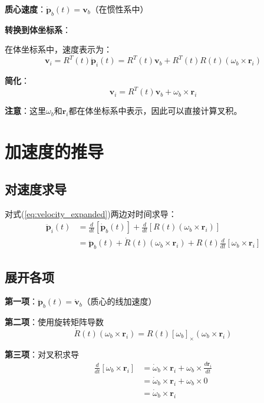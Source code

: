 \documentclass[12pt,a4paper]{article}
\begin{document}
\textbf{质心速度}：$\dot{\bm{p}}_b(t) = \bm{v}_b$（在惯性系中）

\textbf{转换到体坐标系}：

在体坐标系中，速度表示为：
\begin{equation}
\bm{v}_i = R^T(t) \dot{\bm{p}}_i(t) = R^T(t) \bm{v}_b + R^T(t) R(t) (\omega_b \times \bm{r}_i)
\end{equation}

\textbf{简化}：
\begin{equation}
\bm{v}_i = R^T(t) \bm{v}_b + \omega_b \times \bm{r}_i
\end{equation}

\textbf{注意}：这里$\omega_b$和$\bm{r}_i$都在体坐标系中表示，因此可以直接计算叉积。

\section{加速度的推导}

\subsection{对速度求导}

对式(\ref{eq:velocity_expanded})两边对时间求导：
\begin{align}
\ddot{\bm{p}}_i(t) &= \frac{d}{dt}[\dot{\bm{p}}_b(t)] + \frac{d}{dt}[R(t) (\omega_b \times \bm{r}_i)] \\
&= \ddot{\bm{p}}_b(t) + \dot{R}(t) (\omega_b \times \bm{r}_i) + R(t) \frac{d}{dt}[\omega_b \times \bm{r}_i]
\label{eq:acceleration_expanded}
\end{align}

\subsection{展开各项}

\textbf{第一项}：$\ddot{\bm{p}}_b(t) = \dot{\bm{v}}_b$（质心的线加速度）

\textbf{第二项}：使用旋转矩阵导数
\begin{equation}
\dot{R}(t) (\omega_b \times \bm{r}_i) = R(t) [\omega_b]_{\times} (\omega_b \times \bm{r}_i)
\end{equation}

\textbf{第三项}：对叉积求导
\begin{align}
\frac{d}{dt}[\omega_b \times \bm{r}_i] &= \dot{\omega}_b \times \bm{r}_i + \omega_b \times \frac{d\bm{r}_i}{dt} \\
&= \dot{\omega}_b \times \bm{r}_i + \omega_b \times 0 \\
&= \dot{\omega}_b \times \bm{r}_i
\end{align}
\end{document}
